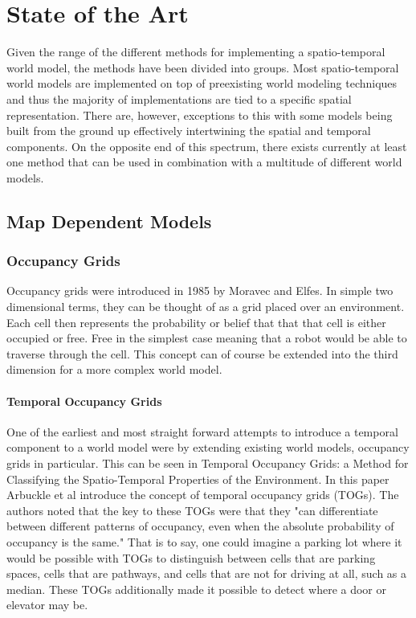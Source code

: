 
  \chapter{ State of the Art }

  Given the range of the different methods for implementing a spatio-temporal
  world model, the methods have been divided into groups.  Most spatio-temporal
  world models are implemented on top of preexisting world modeling techniques
  and thus the majority of implementations are tied to a specific spatial
  representation. There are, however, exceptions to this with some models being
  built from the ground up effectively intertwining the spatial and temporal
  components. On the opposite end of this spectrum, there exists currently at
  least one method that can be used in combination with a multitude of different
  world models.


  \section{ Map Dependent Models }

  \subsection{ Occupancy Grids }

  Occupancy grids were introduced in 1985 by Moravec and Elfes. \cite{Elfes1985}
  In simple two dimensional terms, they can be thought of as a grid placed
  over an environment. Each cell then represents the probability or belief that
  that that cell is either occupied or free. Free in the simplest case meaning
  that a robot would be able to traverse through the cell. This concept can of
  course be extended into the third dimension for a more complex world model. \\

  \subsubsection{ Temporal Occupancy Grids }
  One of the earliest and most straight forward attempts to introduce a temporal
  component to a world model were by extending existing world models, occupancy
  grids in particular. This can be seen in Temporal Occupancy Grids: a Method for
  Classifying the Spatio-Temporal Properties of the Environment.
  \cite{Arbuckle2002} In this paper Arbuckle et al introduce the concept of
  temporal occupancy grids (TOGs). The authors noted that the key to these TOGs
  were that they "can differentiate between different patterns of occupancy, even
  when the absolute probability of occupancy is the same." That is to say, one
  could imagine a parking lot where it would be possible with TOGs to distinguish
  between cells that are parking spaces, cells that are pathways, and cells that
  are not for driving at all, such as a median. These TOGs additionally made it
  possible to detect where a door or elevator may be. \\

